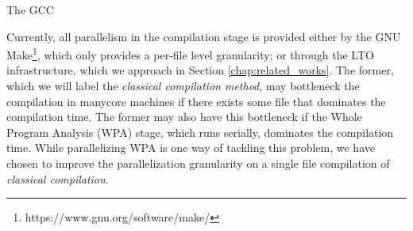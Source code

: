 \begin{section}{The GCC}



Currently, all parallelism in the compilation stage is provided either by the
GNU Make\footnote{https://www.gnu.org/software/make/}, which only provides a
per-file level granularity; or through the LTO infrastructure, which we
approach in Section \ref{chap:related_works}. The former, which we will label
the \textit{classical compilation method}, may bottleneck the compilation in
manycore machines if there exists some file that dominates the compilation time.
The former may also have this bottleneck if the Whole Program Analysis (WPA) stage,
which runs serially, dominates the compilation time. While parallelizing
WPA is one way of tackling this problem, we have chosen to improve the parallelization
granularity on a single file compilation of \textit{classical compilation}.




\end{section}
